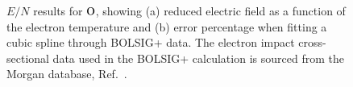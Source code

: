 \begin{figure}[h]
\caption{$E/N$ results for $\rm O$, showing (a) reduced electric field as a function of the electron temperature and (b) error percentage when fitting a cubic spline through BOLSIG+ data. The electron impact cross-sectional data used in the BOLSIG+ calculation is sourced from the Morgan database, Ref.\ \cite{lxc:2024:morgan}.}
\label{fig:electronimpact_5}
\end{figure}
%

